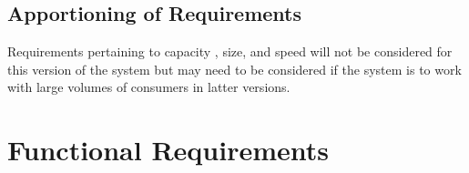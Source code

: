 \documentclass[english]{article}
\begin{document}
\subsection{Apportioning of Requirements}
\label{sub:apportioning_of_requirements}
Requirements pertaining to capacity , size, and speed will not be considered for this version of the system but may need to be considered if the system is to work with large volumes of consumers in latter versions. 


\section{Functional Requirements}
\label{sec:functional_requirements}

\end{document}
